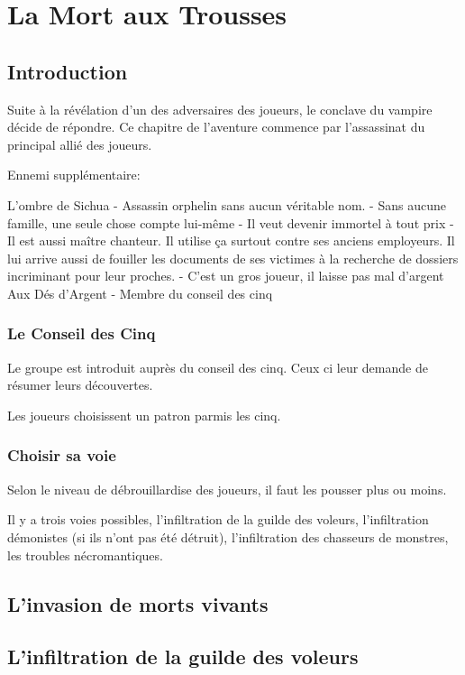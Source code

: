 \section{La Mort aux Trousses}

\subsection*{Introduction}

Suite à la révélation d'un des adversaires des joueurs, le conclave du vampire décide de répondre.
Ce chapitre de l'aventure commence par l'assassinat du principal allié des joueurs.

Ennemi supplémentaire:

L'ombre de Sichua
 - Assassin orphelin sans aucun véritable nom.
 - Sans aucune famille, une seule chose compte lui-même
 - Il veut devenir immortel à tout prix
 - Il est aussi maître chanteur. Il utilise ça surtout contre ses anciens
   employeurs. Il lui arrive aussi de fouiller les documents de ses
   victimes à la recherche de dossiers incriminant pour leur proches.
 - C'est un gros joueur, il laisse pas mal d'argent Aux Dés d'Argent
 - Membre du conseil des cinq

\subsubsection*{Le Conseil des Cinq}

Le groupe est introduit auprès du conseil des cinq. Ceux ci leur demande de 
résumer leurs découvertes.

Les joueurs choisissent un patron parmis les cinq.

\subsubsection*{Choisir sa voie}

Selon le niveau de débrouillardise des joueurs, il faut les pousser plus ou moins.

Il y a trois voies possibles, l'infiltration de la guilde des voleurs, l'infiltration
démonistes (si ils n'ont pas été détruit), l'infiltration des chasseurs de monstres,
les troubles nécromantiques.

\subsection*{L'invasion de morts vivants}

\subsection*{L'infiltration de la guilde des voleurs}

